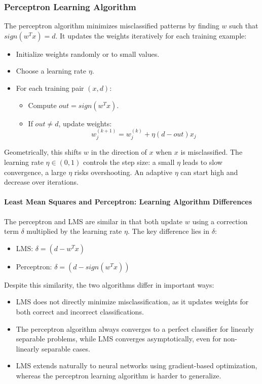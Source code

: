 \subsubsection{Perceptron Learning Algorithm}

The perceptron algorithm minimizes misclassified patterns by finding $w$ such that $sign(w^Tx) = d$. It updates the weights iteratively for each training example:

\begin{itemize}
    \item Initialize weights randomly or to small values.
    \item Choose a learning rate $\eta$.
    \item For each training pair $(x, d)$:
    \begin{itemize}
        \item Compute $out = sign(w^T x)$.
        \item If $out \neq d$, update weights:
        \begin{equation*}
            w_j^{(k+1)} = w_j^{(k)} + \eta (d - out) x_j
        \end{equation*}
    \end{itemize}
\end{itemize}

Geometrically, this shifts $w$ in the direction of $x$ when $x$ is misclassified.
The learning rate $\eta \in (0,1)$ controls the step size: a small $\eta$ leads to slow convergence, a large $\eta$ risks overshooting. An adaptive $\eta$ can start high and decrease over iterations.

\paragraph{Least Mean Squares and Perceptron: Learning Algorithm Differences}
The perceptron and LMS are similar in that both update $w$ using a correction term $\delta$ multiplied by the learning rate $\eta$. The key difference lies in $\delta$:
\begin{itemize}
    \item LMS: $\delta = (d - w^Tx)$
    \item Perceptron: $\delta = (d - sign(w^Tx))$
\end{itemize}

Despite this similarity, the two algorithms differ in important ways:
\begin{itemize}
    \item LMS does not directly minimize misclassification, as it updates weights for both correct and incorrect classifications.
    \item The perceptron algorithm always converges to a perfect classifier for linearly separable problems, while LMS converges asymptotically, even for non-linearly separable cases.
    \item LMS extends naturally to neural networks using gradient-based optimization, whereas the perceptron learning algorithm is harder to generalize.
\end{itemize}

